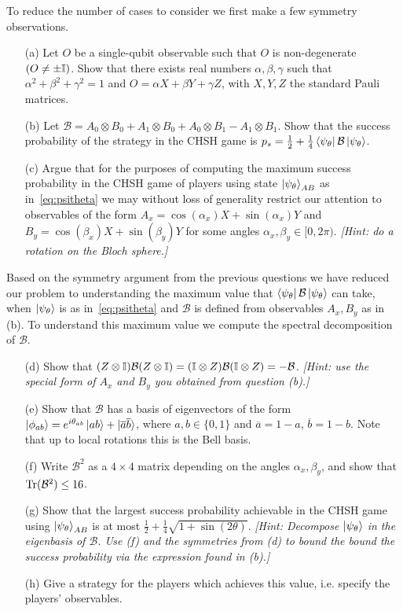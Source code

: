 \documentclass[12pt]{article}
\begin{document}
\begin{enumerate}
To reduce the number of cases to consider we first make a few symmetry observations. 
\begin{enumerate}
\item[(a)] Let $O$ be a single-qubit observable such that $O$ is non-degenerate $(O\neq \pm \mathbb{I})$. Show that there exists real numbers $\alpha,\beta,\gamma$ such that $\alpha^2 + \beta^2 + \gamma^2 = 1$ and $O = \alpha X + \beta Y + \gamma Z$, with $X,Y,Z$ the standard Pauli matrices. 
\item[(b)] Let $\mathcal{B} = A_0\otimes B_0 + A_1\otimes B_0 + A_0\otimes B_1 - A_1 \otimes B_1$. Show that the success probability of the strategy in the CHSH game is $p_s = \frac{1}{2} + \frac{1}{4} \bra{\psi_\theta}\mathcal{B} \ket{\psi_\theta}$.
\item[(c)] Argue that for the purposes of computing the maximum success probability in the CHSH game of players using state $\ket{\psi_\theta}_{AB}$ as in~\eqref{eq:psitheta} we may without loss of generality restrict our attention to observables of the form $A_x = \cos(\alpha_x) X + \sin(\alpha_x)Y$ and $B_y =  \cos(\beta_x) X + \sin(\beta_y)Y$ for some angles $\alpha_x,\beta_y \in [0,2\pi)$. \emph{[Hint: do a rotation on the Bloch sphere.]}
\end{enumerate}
Based on the symmetry argument from the previous questions we have reduced our problem to understanding the maximum value that $\bra{\psi_\theta} \mathcal{B} \ket{\psi_\theta}$ can take, when $\ket{\psi_\theta}$ is as in~\eqref{eq:psitheta} and $\mathcal{B}$ is defined from observables $A_x,B_y$ as in (b). To understand this maximum value we compute the spectral decomposition of $\mathcal{B}$. 
\begin{enumerate}
\item[(d)] Show that $(Z\otimes \mathbb{I}) \mathcal{B} (Z\otimes \mathbb{I}) =  (\mathbb{I}\otimes Z) \mathcal{B} (\mathbb{I}\otimes Z) = -\mathcal{B}$. \emph{[Hint: use the special form of $A_x$ and $B_y$ you obtained from question (b).]}
\item[(e)] Show that $\mathcal{B}$ has a basis of eigenvectors of the form $\ket{\phi_{ab}} = e^{i\theta_{ab}} \ket{ab} + \ket{\overline{a}\overline{b}}$, where $a,b\in\{0,1\}$ and $\overline{a}=1-a$, $\overline{b}=1-b$. Note that up to local rotations this is the Bell basis. 
\item[(f)] Write $\mathcal{B}^2$ as a $4\times 4$ matrix depending on the angles $\alpha_x,\beta_y$, and show that $\mathrm{Tr}(\mathcal{B}^2)\leq 16$.
\item[(g)] Show that the largest success probability achievable in the CHSH game using $\ket{\psi_\theta}_{AB}$ is at most  $\frac{1}{2} + \frac{1}{4}\sqrt{1+\sin(2\theta)}$. \emph{[Hint: Decompose $\ket{\psi_\theta}$ in the eigenbasis of $\mathcal{B}$. Use (f) and the symmetries from (d) to bound the bound the success probability via the expression found in (b).]} 
\item[(h)] Give a strategy for the players which achieves this value, i.e. specify the players'  observables. 
\end{enumerate}


\end{enumerate}
\end{document}
